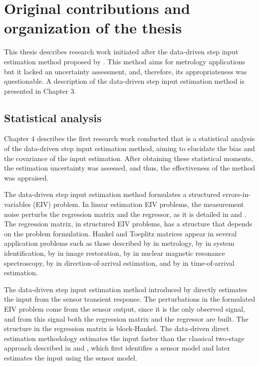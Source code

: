\section{Original contributions \color{blue}and organization of the thesis\color{black}}


This thesis describes research work initiated after the data-driven step input estimation method proposed by \citet{Markovsky15cep}.
This method aims for metrology applications but it lacked an uncertainty assessment, and, therefore, its appropriateness was questionable.
\color{blue}A description of the data-driven step input estimation method is presented in Chapter 3\color{black}.

\subsection{Statistical analysis}

\color{blue}Chapter 4 describes \color{black} the first research work conducted that is a statistical analysis of the data-driven step input estimation method, aiming to elucidate the bias and the covariance of the input estimation.
After obtaining these statistical moments, the estimation uncertainty was assessed, and thus, the effectiveness of the method was appraised.

The data-driven step input estimation method formulates a structured errors-in-variables (EIV) problem.
In linear estimation EIV problems, the measurement noise perturbs the regression matrix and the regressor, as it is detailed in \citet{VanHuffel91Book} and \citet{Markovsky07overview}.
The regression matrix, in structured EIV problems, has a structure that depends on the problem formulation.
Hankel and Toeplitz matrices appear in several application problems such as those described by \citet{Markovsky15cep} in metrology, by \citet{Soderstrom07} in system identification, by \citet{Feiz17} in image restoration, by \citet{Cai16} in nuclear magnetic resonance spectroscopy, by \citet{Pan18} in direction-of-arrival estimation, and by \citet{Jia18} in time-of-arrival estimation.

The data-driven step input estimation method introduced by \citet{Markovsky15cep} directly estimates the input from the sensor transient response. 
The perturbations in the formulated EIV problem come from the sensor output, since it is the only observed signal, and from this signal both the regression matrix and the regressor are built.
The structure in the regression matrix is block-Hankel.
The data-driven direct estimation methodology  estimates the input faster than the classical two-stage approach described in \citet{Azam15} and \citet{Niedzwiecki16a}, which first identifies a sensor model and later estimates the input using the sensor model.

